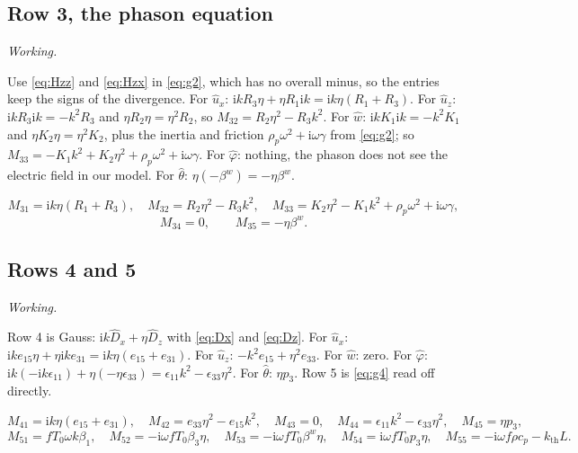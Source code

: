 \documentclass[11pt,a4paper]{article}
\newif\ifshowworked \showworkedtrue
\newenvironment{worked}{\ifshowworked\par\smallskip\noindent\textit{Working.}\par\else\setbox0\vbox\bgroup\fi}{\ifshowworked\par\smallskip\else\egroup\fi}
\newcommand{\ii}{\mathrm{i}}
\newcommand{\bx}{\hat u_x}
\newcommand{\bz}{\hat u_z}
\newcommand{\bw}{\hat w}
\newcommand{\bp}{\hat\varphi}
\newcommand{\bt}{\hat\theta}
\newcommand{\kB}{k_{\mathrm{th}}}
\newcommand{\bwth}{\beta^{w}}
\begin{document}
\subsection{Row 3, the phason equation}

\begin{worked}
Use \eqref{eq:Hzz} and \eqref{eq:Hzx} in \eqref{eq:g2}, which has no overall minus, so the entries keep the
signs of the divergence. For $\bx$: $\ii kR_3\eta+\eta R_1\ii k=\ii k\eta(R_1+R_3)$. For $\bz$:
$\ii kR_3\ii k=-k^2R_3$ and $\eta R_2\eta=\eta^2R_2$, so $M_{32}=R_2\eta^2-R_3k^2$.
For $\bw$: $\ii kK_1\ii k=-k^2K_1$ and $\eta K_2\eta=\eta^2K_2$, plus the inertia and friction
$\rho_p\omega^2+\ii\omega\gamma$ from \eqref{eq:g2}; so $M_{33}=-K_1k^2+K_2\eta^2+\rho_p\omega^2+\ii\omega\gamma$.
For $\bp$: nothing, the phason does not see the electric field in our model. For $\bt$: $\eta(-\bwth)=-\eta\bwth$.
\end{worked}

\noindent
\begin{equation}\label{eq:row3}
M_{31}=\ii k\eta(R_1+R_3),\quad
M_{32}=R_2\eta^2-R_3k^2,\quad
M_{33}=K_2\eta^2-K_1k^2+\rho_p\omega^2+\ii\omega\gamma,
\end{equation}
\begin{equation}\label{eq:row3b}
M_{34}=0,\qquad M_{35}=-\eta\bwth .
\end{equation}

\subsection{Rows 4 and 5}

\begin{worked}
Row 4 is Gauss: $\ii k\hat D_x+\eta\hat D_z$ with \eqref{eq:Dx} and \eqref{eq:Dz}. For $\bx$:
$\ii ke_{15}\eta+\eta\ii ke_{31}=\ii k\eta(e_{15}+e_{31})$. For $\bz$: $-k^2e_{15}+\eta^2e_{33}$. For $\bw$:
zero. For $\bp$: $\ii k(-\ii k\epsilon_{11})+\eta(-\eta\epsilon_{33})=\epsilon_{11}k^2-\epsilon_{33}\eta^2$.
For $\bt$: $\eta p_3$. Row 5 is \eqref{eq:g4} read off directly.
\end{worked}

\noindent
\begin{equation}\label{eq:row4}
M_{41}=\ii k\eta(e_{15}+e_{31}),\quad M_{42}=e_{33}\eta^2-e_{15}k^2,\quad M_{43}=0,\quad
M_{44}=\epsilon_{11}k^2-\epsilon_{33}\eta^2,\quad M_{45}=\eta p_3,
\end{equation}
\begin{equation}\label{eq:row5}
M_{51}=fT_0\omega k\beta_1,\quad M_{52}=-\ii\omega fT_0\beta_3\eta,\quad
M_{53}=-\ii\omega fT_0\bwth\eta,\quad M_{54}=\ii\omega fT_0p_3\eta,\quad
M_{55}=-\ii\omega f\rho c_p-\kB L .
\end{equation}
\end{document}
